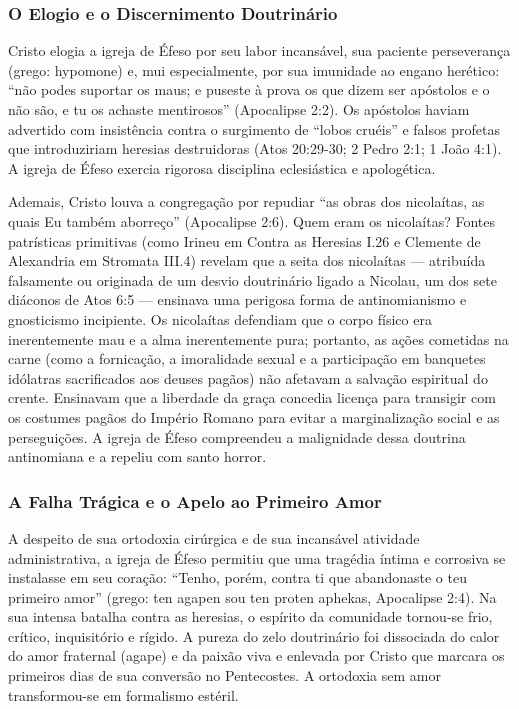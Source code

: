 \documentclass[11pt,a4paper,openany]{book}
\begin{document}
\subsubsection*{O Elogio e o Discernimento Doutrinário}
Cristo elogia a igreja de Éfeso por seu labor incansável, sua paciente perseverança (grego: hypomone) e, mui especialmente, por sua imunidade ao engano herético: ``não podes suportar os maus; e puseste à prova os que dizem ser apóstolos e o não são, e tu os achaste mentirosos'' (Apocalipse 2:2). Os apóstolos haviam advertido com insistência contra o surgimento de ``lobos cruéis'' e falsos profetas que introduziriam heresias destruidoras (Atos 20:29-30; 2 Pedro 2:1; 1 João 4:1). A igreja de Éfeso exercia rigorosa disciplina eclesiástica e apologética.

Ademais, Cristo louva a congregação por repudiar ``as obras dos nicolaítas, as quais Eu também aborreço'' (Apocalipse 2:6). Quem eram os nicolaítas? Fontes patrísticas primitivas (como Irineu em Contra as Heresias I.26 e Clemente de Alexandria em Stromata III.4) revelam que a seita dos nicolaítas — atribuída falsamente ou originada de um desvio doutrinário ligado a Nicolau, um dos sete diáconos de Atos 6:5 — ensinava uma perigosa forma de antinomianismo e gnosticismo incipiente. Os nicolaítas defendiam que o corpo físico era inerentemente mau e a alma inerentemente pura; portanto, as ações cometidas na carne (como a fornicação, a imoralidade sexual e a participação em banquetes idólatras sacrificados aos deuses pagãos) não afetavam a salvação espiritual do crente. Ensinavam que a liberdade da graça concedia licença para transigir com os costumes pagãos do Império Romano para evitar a marginalização social e as perseguições. A igreja de Éfeso compreendeu a malignidade dessa doutrina antinomiana e a repeliu com santo horror.


\subsubsection*{A Falha Trágica e o Apelo ao Primeiro Amor}
A despeito de sua ortodoxia cirúrgica e de sua incansável atividade administrativa, a igreja de Éfeso permitiu que uma tragédia íntima e corrosiva se instalasse em seu coração: ``Tenho, porém, contra ti que abandonaste o teu primeiro amor'' (grego: ten agapen sou ten proten aphekas, Apocalipse 2:4). Na sua intensa batalha contra as heresias, o espírito da comunidade tornou-se frio, crítico, inquisitório e rígido. A pureza do zelo doutrinário foi dissociada do calor do amor fraternal (agape) e da paixão viva e enlevada por Cristo que marcara os primeiros dias de sua conversão no Pentecostes. A ortodoxia sem amor transformou-se em formalismo estéril.
\end{document}
